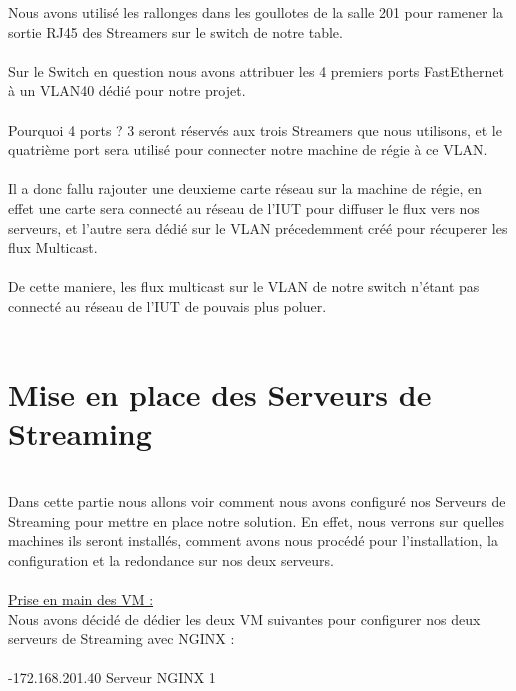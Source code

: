 \documentclass{report}
\begin{document}
    Nous avons utilisé les rallonges dans les goullotes de la salle 201 pour ramener la sortie RJ45 des Streamers sur le switch de notre table. 
    \\
    \\
    Sur le Switch en question nous avons attribuer les 4 premiers ports FastEthernet à un VLAN40 dédié pour notre projet. 
    \\
    \\
    Pourquoi 4 ports ? 3 seront réservés aux trois Streamers que nous utilisons, et le quatrième port sera utilisé pour connecter notre machine de régie à ce VLAN.
    \\
    \\
    Il a donc fallu rajouter une deuxieme carte réseau sur la machine de régie, en effet une carte sera connecté au réseau de l’IUT pour diffuser le flux vers nos serveurs, et l’autre sera dédié sur le VLAN précedemment créé pour récuperer les flux Multicast.
    \\
    \\
    De cette maniere, les flux multicast sur le VLAN de notre switch n’étant pas connecté au réseau de l’IUT de pouvais plus poluer.
    \\
    \\
    

    \section{Mise en place des Serveurs de Streaming}\\
    
    Dans cette partie nous allons voir comment nous avons configuré nos Serveurs de Streaming pour mettre en place notre solution. En effet, nous verrons sur quelles machines ils seront installés, comment avons nous procédé pour l’installation, la configuration et la redondance sur nos deux serveurs.
    \\
    \\
    
    \underline{Prise en main des VM :}\\
    
    Nous avons décidé de dédier les deux VM suivantes pour configurer nos deux serveurs de Streaming avec NGINX :
    \\
    \\
    
     -172.168.201.40   \rightarrow Serveur NGINX 1
     \\
     \\
     
\end{document}
